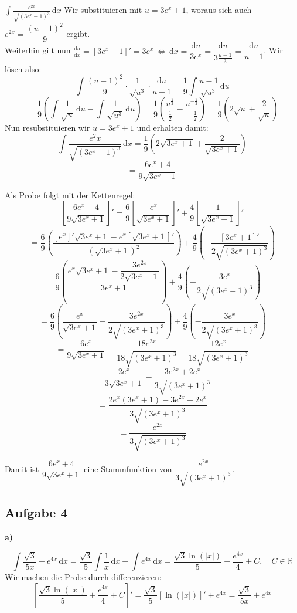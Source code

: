 \documentclass[a4paper,graphics,11pt]{article}
\newcommand{\aufgabe}[1]{\subsection*{Aufgabe #1}}
\begin{document}
$
    \displaystyle\int \frac{e^{2x}}{\sqrt{(3e^x+1)^3}}\, \mathrm{d}x
$
\quad Wir substituieren mit $u = 3e^x+1$, woraus sich auch $e^{2x} = \dfrac{(u-1)^2}{9}$ ergibt.\\[5pt]
Weiterhin gilt nun
$\frac{\mathrm{d}u}{\mathrm{d}x}
= [3e^x+1]'
= 3e^x \,\Longleftrightarrow\, \mathrm{d}x
= \dfrac{\mathrm{d}u}{3e^x}
= \dfrac{\mathrm{d}u}{3\frac{u-1}{3}}
= \dfrac{\mathrm{d}u}{u-1}
$. Wir lösen also:
$$
    \int \frac{(u-1)^2}{9} \cdot \frac{1}{\sqrt{u^3}}\cdot \frac{\mathrm{d}u}{u-1}
    = \frac{1}{9}\int \frac{u-1}{\sqrt{u^3}}\, \mathrm{d}u
$$$$
    = \frac{1}{9}\left(\int \frac{1}{\sqrt{u}}\, \mathrm{d}u - \int \frac{1}{\sqrt{u^3}}\, \mathrm{d}u\right)
    = \frac{1}{9}\left(\frac{u^{\frac{1}{2}}}{\frac{1}{2}} - \frac{u^{-\frac{1}{2}}}{-\frac{1}{2}}\right)
    = \frac{1}{9}\left(2\sqrt{u} + \frac{2}{\sqrt{u}}\right)
$$
Nun resubstituieren wir $u = 3e^x+1$ und erhalten damit:
$$
    \int \frac{e^2x}{\sqrt{(3e^x+1)^3}}\,\mathrm{d}x = \frac{1}{9}\left(2\sqrt{3e^x+1} + \frac{2}{\sqrt{3e^x+1}}\right)
$$$$
    = \frac{6e^x+4}{9\sqrt{3e^x+1}}
$$

Als Probe folgt mit der Kettenregel:
$$
    \left[\frac{6e^x+4}{9\sqrt{3e^x+1}}\right]'
    = \frac{6}{9}\left[\frac{e^x}{\sqrt{3e^x+1}}\right]' + \frac{4}{9}\left[\frac{1}{\sqrt{3e^x+1}}\right]'
$$$$
    = \frac{6}{9}\left(\frac{[e^x]'\sqrt{3e^x+1} -e^x\left[\sqrt{3e^x+1}\right]'}{\left(\sqrt{3e^x+1}\right)^2} \right)
        +\frac{4}{9}\left(-\frac{[3e^x+1]'}{2\sqrt{(3e^x+1)^3}}\right)
$$$$
    = \frac{6}{9}\left(\frac{e^x\sqrt{3e^x+1} - \dfrac{3e^{2x}}{2\sqrt{3e^x+1}}}{3e^x+1} \right)
        +\frac{4}{9}\left(-\frac{3e^x}{2\sqrt{(3e^x+1)^3}}\right)
$$$$
    = \frac{6}{9}\left(\frac{e^x}{\sqrt{3e^x+1}} - \frac{3e^{2x}}{2\sqrt{(3e^x+1)^3}}\right)
        +\frac{4}{9}\left(-\frac{3e^x}{2\sqrt{(3e^x+1)^3}}\right)
$$$$
    = \frac{6e^x}{9\sqrt{3e^x+1}} - \frac{18e^{2x}}{18\sqrt{(3e^x+1)^3}} -\frac{12e^x}{18\sqrt{(3e^x+1)^3}}
$$$$
     = \frac{2e^x}{3\sqrt{3e^x+1}} - \frac{3e^{2x}+2e^x}{3\sqrt{(3e^x+1)^3}}
$$$$
     = \frac{2e^x(3e^x+1) - 3e^{2x}-2e^x}{3\sqrt{(3e^x+1)^3}}
$$$$
    = \frac{e^{2x}}{3\sqrt{(3e^x+1)^3}}
$$

Damit ist $\dfrac{6e^x+4}{9\sqrt{3e^x+1}}$ eine Stammfunktion von $\dfrac{e^{2x}}{3\sqrt{(3e^x+1)^3}}$.

\newpage

\aufgabe{4}

\textbf{a)}

$$
    \int \frac{\sqrt{3}}{5x}+e^{4x}\, \mathrm{d}x
    = \frac{\sqrt{3}}{5}\int \frac{1}{x}\, \mathrm{d}x + \int e^{4x}\, \mathrm{d}x
    = \frac{\sqrt{3}\ln(|x|)}{5} + \frac{e^{4x}}{4} + C,\quad C \in \mathbb{R}
$$
Wir machen die Probe durch differenzieren:
$$
    \left[\frac{\sqrt{3}\ln(|x|)}{5} + \frac{e^{4x}}{4} + C\right]'
    = \frac{\sqrt{3}}{5}[\ln(|x|)]' + e^{4x}
    = \frac{\sqrt{3}}{5x} + e^{4x}
$$
\end{document}
